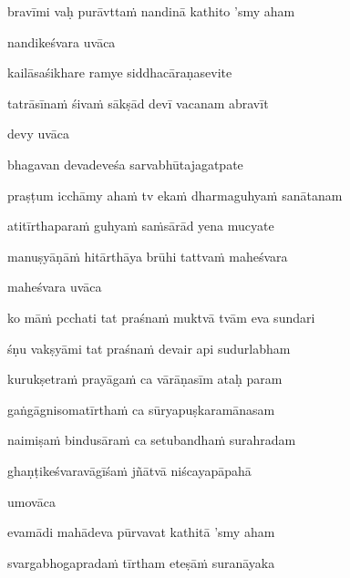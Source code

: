 bravīmi vaḥ purāvtta\.m nandinā kathito 'smy aham \veg\dontdisplaylinenum

nandikeśvara uvāca~{\dandab}\dontdisplaylinenum 

kailāsaśikhare ramye siddhacāraṇasevite\thinspace{\danda} \dontdisplaylinenum

tatrāsīna\.m śiva\.m sākṣād devī vacanam abravīt \veg\dontdisplaylinenum

devy uvāca~{\dandab}\dontdisplaylinenum 

bhagavan devadeveśa sarvabhūtajagatpate\thinspace{\danda} \dontdisplaylinenum

praṣṭum icchāmy aha\.m tv eka\.m dharmaguhya\.m sanātanam \veg\dontdisplaylinenum

atitīrthapara\.m guhya\.m sa\.msārād yena mucyate\thinspace{\dandab} \dontdisplaylinenum

manuṣyāṇā\.m hitārthāya brūhi tattva\.m maheśvara \veg\dontdisplaylinenum

maheśvara uvāca~{\dandab}\dontdisplaylinenum 

ko mā\.m pcchati tat praśna\.m muktvā tvām eva sundari\thinspace{\danda} \dontdisplaylinenum

śṇu vakṣyāmi tat praśna\.m devair api sudurlabham \veg\dontdisplaylinenum

kurukṣetra\.m prayāga\.m ca vārāṇasīm ataḥ param\thinspace{\dandab} \dontdisplaylinenum

gaṅgāgnisomatīrtha\.m ca sūryapuṣkaramānasam \veg\dontdisplaylinenum

naimiṣa\.m bindusāra\.m ca setubandha\.m surahradam\thinspace{\dandab} \dontdisplaylinenum

ghaṇṭikeśvaravāgīśa\.m jñātvā niścayapāpahā \veg\dontdisplaylinenum

umovāca~{\dandab}\dontdisplaylinenum 

evamādi mahādeva pūrvavat kathitā 'smy aham\thinspace{\danda} \dontdisplaylinenum

svargabhogaprada\.m tīrtham eteṣā\.m suranāyaka \veg\dontdisplaylinenum

